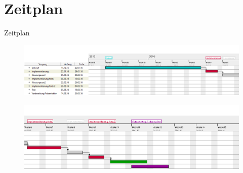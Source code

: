 \documentclass[18pt]{beamer}
\begin{document}
\section{Zeitplan}
\begin{frame}{Zeitplan}
    \begin{figure}
      \centering
      \includegraphics[width=\textwidth]{./images/timeline1.png}
    \end{figure}
    
    \begin{figure}
      \centering
      \includegraphics[width=\textwidth]{./images/timeline2.png}
    \end{figure}
\end{frame}

\appendix
\beginbackup


\backupend
\end{document}
